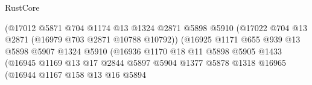 \begin{lexlean}{RustCore}
\begin{coremodule}
                                            (@17012
                                              @5871
                                              @704
                                              @1174
                                              @13
                                              @1324
                                              @2871
                                              @5898
                                              @5910
                                              (@17022
                                                @704
                                                @13
                                                @2871
                                                (@16979 @703 @2871 @10788 @10792))
                                              (@16925
                                                @1171
                                                @655
                                                @939
                                                @13
                                                @5898
                                                @5907
                                                @1324
                                                @5910
                                                (@16936
                                                  @1170
                                                  @18
                                                  @11
                                                  @5898
                                                  @5905
                                                  @1433
                                                  (@16945
                                                    @1169
                                                    @13
                                                    @17
                                                    @2844
                                                    @5897
                                                    @5904
                                                    @1377
                                                    @5878
                                                    @1318
                                                    @16965
                                                    (@16944
                                                      @1167
                                                      @158
                                                      @13
                                                      @16
                                                      @5894

\end{coremodule}
\end{lexlean}
